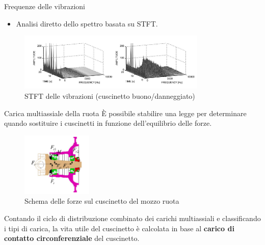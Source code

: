 \documentclass{beamer}
\begin{document}
\begin{frame}[allowframebreaks]{Frequenze delle vibrazioni}
\begin{itemize}
        \item Analisi diretto dello spettro basata su STFT\cite{rubio2012experimental}.
    \end{itemize}
    
    \begin{figure}
        \centering
        \includegraphics[width=0.8\textwidth]{Figures/STFT.png}
        \caption{STFT delle vibrazioni (cuscinetto buono/danneggiato)}
        \label{fig:STFT}
    \end{figure}
\end{frame}

\begin{frame}{Carica multiassiale della ruota}
    \small
    È possibile stabilire una legge per determinare quando sostituire i cuscinetti in funzione dell'equilibrio delle forze\cite{zhao2021service}.

    \begin{figure}
        \centering
        \includegraphics[width=0.3\textwidth]{Figures/Force_Diagram.png}
        \caption{Schema delle forze sul cuscinetto del mozzo ruota}
        \label{fig:Forces_Bearing}
    \end{figure}

    Contando il ciclo di distribuzione combinato dei carichi multiassiali e classificando i tipi di carica, la vita utile del cuscinetto è calcolata in base al \textbf{carico di contatto circonferenziale} del cuscinetto.
\end{frame}
\end{document}
